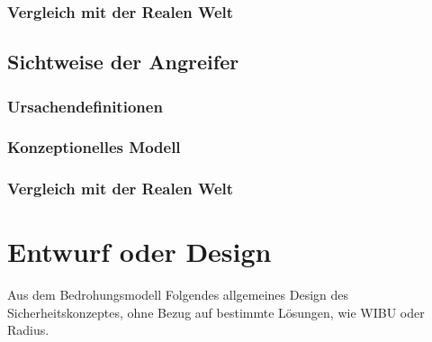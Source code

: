 \documentclass[11pt,a4paper]{report}
\begin{document}

\subsection{Vergleich mit der Realen Welt}

\section{Sichtweise der Angreifer}

\subsection{Ursachendefinitionen}

\subsection{Konzeptionelles Modell}

\subsection{Vergleich mit der Realen Welt}


\chapter{Entwurf oder Design} \label{chap:design}

Aus dem Bedrohungsmodell Folgendes allgemeines Design des Sicherheitskonzeptes, ohne Bezug auf bestimmte Lösungen, wie WIBU oder Radius.

\end{document}
